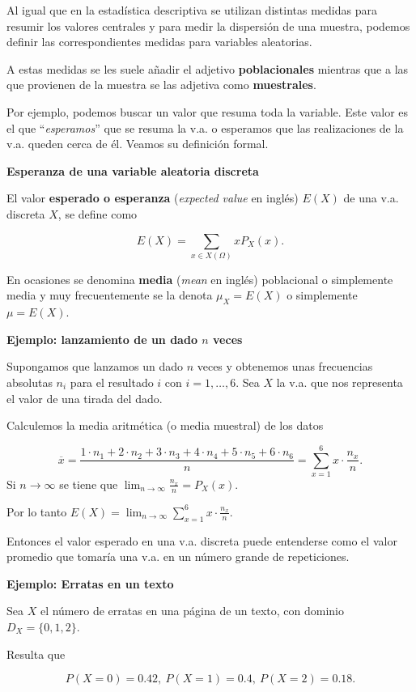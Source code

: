 \documentclass[
  letterpaper,
  DIV=11,
  numbers=noendperiod]{scrreprt}
\begin{document}
Al igual que en la estadística descriptiva se utilizan distintas medidas
para resumir los valores centrales y para medir la dispersión de una
muestra, podemos definir las correspondientes medidas para variables
aleatorias.

A estas medidas se les suele añadir el adjetivo \textbf{poblacionales}
mientras que a las que provienen de la muestra se las adjetiva como
\textbf{muestrales}.

Por ejemplo, podemos buscar un valor que resuma toda la variable. Este
valor es el que ``\emph{esperamos}'' que se resuma la v.a. o esperamos
que las realizaciones de la v.a. queden cerca de él. Veamos su
definición formal.

\textbf{Esperanza de una variable aleatoria discreta }

El valor \textbf{esperado o esperanza} (\emph{expected value} en inglés)
\(E(X)\) de una v.a. discreta \(X\), se define como

\[
E(X)=\sum_{x\in X(\Omega)} x P_{X}(x).
\]

En ocasiones se denomina \textbf{media} (\emph{mean} en inglés)
poblacional o simplemente media y muy frecuentemente se la denota
\(\mu_{X}=E(X)\) o simplemente \(\mu=E(X)\).

\textbf{Ejemplo: lanzamiento de un dado \(n\) veces}

Supongamos que lanzamos un dado \(n\) veces y obtenemos unas frecuencias
absolutas \(n_{i}\) para el resultado \(i\) con \(i=1,\ldots,6\). Sea
\(X\) la v.a. que nos representa el valor de una tirada del dado.

Calculemos la media aritmética (o media muestral) de los datos

\[
\overline{x}=\frac{1\cdot n_1+2\cdot  n_2+3\cdot  n_3+4\cdot  n_4+5\cdot  n_5+6 \cdot 
n_6}{n}=\sum_{x=1}^6 x\cdot \frac{n_{x}}{n}.
\] Si \(n\to \infty\) se tiene que
\(\displaystyle\lim_{n\to \infty} \frac{n_{x}}{n}=P_{X}(x).\)

Por lo tanto
\(E(X)=\displaystyle \lim_{n\to\infty}\sum_{x=1}^6 x\cdot \frac{n_{x}}{n}.\)

Entonces el valor esperado en una v.a. discreta puede entenderse como el
valor promedio que tomaría una v.a. en un número grande de repeticiones.

\textbf{Ejemplo: Erratas en un texto}

Sea \(X\) el número de erratas en una página de un texto, con dominio
\(D_X=\{0,1,2\}\).

Resulta que

\[
P(X=0)=0.42,\ P(X=1)=0.4,\ P(X=2)=0.18.
\]
\end{document}
